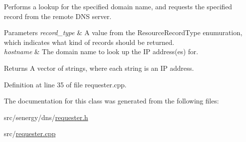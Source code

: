 Performs a lookup for the specified domain name, and requests the specified record from the remote D\-N\-S server. 


\begin{DoxyParams}{Parameters}
{\em record\-\_\-type} & A value from the Resource\-Record\-Type enumuration, which indicates what kind of records should be returned. \\
\hline
{\em hostname} & The domain name to look up the I\-P address(es) for.\\
\hline
\end{DoxyParams}
\begin{DoxyReturn}{Returns}
A vector of strings, where each string is an I\-P address. 
\end{DoxyReturn}


Definition at line 35 of file requester.\-cpp.



The documentation for this class was generated from the following files\-:\begin{DoxyCompactItemize}
\item 
src/senergy/dns/\hyperlink{requester_8h}{requester.\-h}\item 
src/\hyperlink{requester_8cpp}{requester.\-cpp}\end{DoxyCompactItemize}
